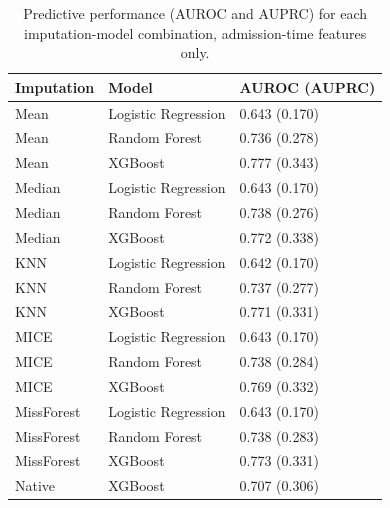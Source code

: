 \documentclass[12pt,a4paper]{report}
\begin{document}
\begin{table}[H]
\centering
\caption[Predictive performance (AUROC and AUPRC) for each imputation-model combination, admission-time features only.]{Predictive performance (AUROC and AUPRC) for each imputation-model combination, admission-time features only.\footnotemark}
\label{tab:baseline-perf}
\small
\begin{tabular}{lll}
\toprule
Imputation & Model & AUROC (AUPRC) \\
\midrule
Mean & Logistic Regression & 0.643 (0.170) \\
Mean & Random Forest & 0.736 (0.278) \\
Mean & XGBoost & 0.777 (0.343) \\
Median & Logistic Regression & 0.643 (0.170) \\
Median & Random Forest & 0.738 (0.276) \\
Median & XGBoost & 0.772 (0.338) \\
KNN & Logistic Regression & 0.642 (0.170) \\
KNN & Random Forest & 0.737 (0.277) \\
KNN & XGBoost & 0.771 (0.331) \\
MICE & Logistic Regression & 0.643 (0.170) \\
MICE & Random Forest & 0.738 (0.284) \\
MICE & XGBoost & 0.769 (0.332) \\
MissForest & Logistic Regression & 0.643 (0.170) \\
MissForest & Random Forest & 0.738 (0.283) \\
MissForest & XGBoost & 0.773 (0.331) \\
Native & XGBoost & 0.707 (0.306) \\
\bottomrule
\end{tabular}
\end{table}
\end{document}
